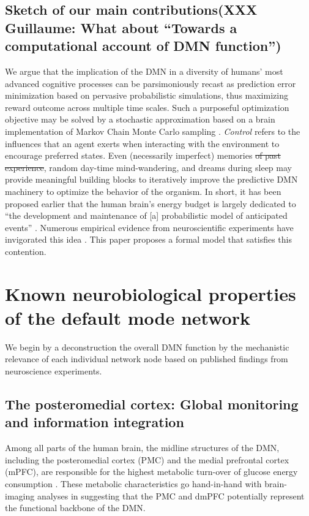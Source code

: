 \documentclass[10pt,letterpaper]{article}
\newcommand{\suggestremove}[1]{{\color{red} \sout{#1}}}
\begin{document}
\subsection{Sketch of our main contributions\textbf{(XXX Guillaume: What about ``Towards a computational account of DMN function'')}}
We argue that the implication of the DMN in a
diversity of humans' most advanced cognitive processes
can be parsimoniously recast as prediction error minimization
based on pervasive probabilistic simulations,
thus maximizing reward outcome across multiple time scales.
Such a purposeful optimization objective
may be solved by a stochastic approximation
based on a brain implementation of Markov Chain Monte Carlo sampling
\citep{tenenbaum2011grow}.
\textit{Control} refers to the influences that an agent exerts when interacting
with the environment to encourage preferred states.
Even (necessarily imperfect) memories
\suggestremove{of past experience}, random day-time mind-wandering, and dreams during sleep
may provide meaningful building blocks to iteratively improve
the predictive DMN machinery to optimize the behavior of the organism.
%
In short, it has been proposed earlier that
the human brain's energy budget is largely dedicated to
``the development and maintenance of [a]
probabilistic model of anticipated events''
\citep{raichle2005intrinsic}.
Numerous empirical evidence from
neuroscientific experiments have invigorated this idea \citep{kording2004bayesian, fiser2004small}.
This paper proposes a formal model that satisfies this contention.




\section{Known neurobiological properties of the default mode network}
We begin by a deconstruction the overall DMN function
by the mechanistic relevance of each individual network node
based on published findings from neuroscience experiments.
%
\subsection{The posteromedial cortex: Global monitoring and information integration}
Among all parts of the human brain,
the midline structures of the DMN,
including the posteromedial cortex (PMC) and
the medial prefrontal cortex (mPFC),
are responsible for the highest metabolic turn-over
of glucose energy consumption \citep{raichle2001pnas}.
These metabolic characteristics go hand-in-hand with
brain-imaging analyses \citep{andrews2010} in
suggesting that the PMC and dmPFC
potentially represent the functional backbone of the DMN.
\end{document}
